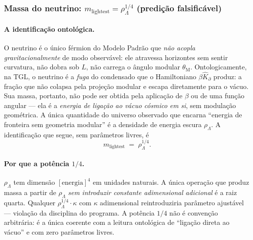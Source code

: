 \documentclass[12pt,a4paper]{article}
\newcommand{\thetaM}{\theta_{\text{M}}}
\newcommand{\TGL}{\textsc{TGL}}
\begin{document}
\subsubsection{Massa do neutrino: $m_{\text{lightest}} = \rho_\Lambda^{1/4}$ (predição falsificável)}
\label{sec:neutrino-mass}

\paragraph{A identificação ontológica.}
O neutrino é o único férmion do Modelo Padrão que \emph{não acopla
gravitacionalmente} de modo observável: ele atravessa horizontes sem
sentir curvatura, não dobra sob $L$, não carrega o ângulo modular
$\thetaM$.  Ontologicamente, na \TGL{}, o neutrino é a \emph{fuga} do
condensado que o Hamiltoniano $\beta\hat K_\partial$ produz: a fração que
não colapsa pela projeção modular e escapa diretamente para o vácuo.  Sua
massa, portanto, não pode ser obtida pela aplicação de $\beta$ ou de uma
função angular --- ela é a \emph{energia de ligação ao vácuo cósmico em si},
sem modulação geométrica.  A única quantidade do universo observado que
encarna ``energia de fronteira sem geometria modular'' é a densidade de
energia escura $\rho_\Lambda$.  A identificação que segue, sem parâmetros
livres, é
\begin{equation}
m_{\text{lightest}} \;=\; \rho_\Lambda^{1/4}.
\label{eq:neutrino-prediction}
\end{equation}

\paragraph{Por que a potência $1/4$.}
$\rho_\Lambda$ tem dimensão $[\mathrm{energia}]^4$ em unidades naturais.  A
única operação que produz massa a partir de $\rho_\Lambda$ \emph{sem
introduzir constante adimensional adicional} é a raiz quarta.  Qualquer
$\rho_\Lambda^{1/4} \cdot \kappa$ com $\kappa$ adimensional reintroduziria
parâmetro ajustável --- violação da disciplina do programa.  A potência
$1/4$ não é convenção arbitrária: é a única coerente com a leitura
ontológica de ``ligação direta ao vácuo'' e com zero parâmetros livres.
\end{document}
